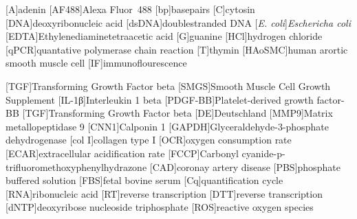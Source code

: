 \begin{acronym}
[A]{adenin}
[AF488]{Alexa Fluor\textsuperscript{\textregistered}~488}
[bp]{basepairs}
[C]{cytosin}
[DNA]{deoxyribonucleic acid}
[dsDNA]{doublestranded DNA}
[\textit{E. coli}]{\textit{Eschericha coli}}
[EDTA]{Ethylenediaminetetraacetic acid}
[G]{guanine}
[HCl]{hydrogen chloride}
[qPCR]{quantative polymerase chain reaction}
[T]{thymin}
[HAoSMC]{human arortic smooth muscle cell}
[IF]{immunoflourescence}


[TGF\beta]{Transforming Growth Factor beta}
[SMGS]{Smooth Muscle Cell Growth Supplement}
[IL-1β]{Interleukin 1 beta}
[PDGF-BB]{Platelet-derived growth factor-BB}
[TGF\beta]{Transforming Growth Factor beta}
[DE]{Deutschland}
[MMP9]{Matrix metallopeptidase 9}
[CNN1]{Calponin 1}
[GAPDH]{Glyceraldehyde-3-phosphate dehydrogenase}
[col I]{collagen type I}
[OCR]{oxygen consumption rate}
[ECAR]{extracellular acidification rate}
[FCCP]{Carbonyl cyanide-p-trifluoromethoxyphenylhydrazone}
[CAD]{coronay artery disease}
[PBS]{phosphate buffered solution}
[FBS]{fetal bovine serum}
[Cq]{quantification cycle}
[RNA]{ribonucleic acid}
[RT]{reverse transcription}
[DTT]{reverse transcription}
[dNTP]{deoxyribose nucleoside triphosphate}
[ROS]{reactive oxygen species}
\end{acronym}

